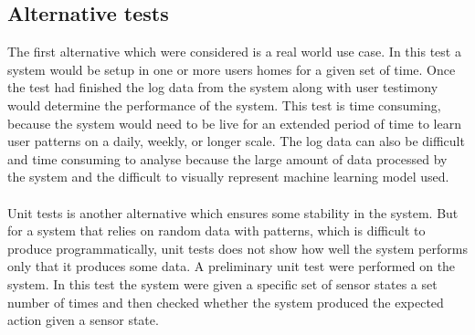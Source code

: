 \subsection{Alternative tests}
The first alternative which were considered is a real world use case. In this test a system would be setup in one or more users homes for a given set of time. Once the test had finished the log data from the system along with user testimony would determine the performance of the system. This test is time consuming, because the system would need to be live for an extended period of time to learn user patterns on a daily, weekly, or longer scale. The log data can also be difficult and time consuming to analyse because the large amount of data processed by the system and the difficult to visually represent machine learning model used.
\\\\
Unit tests is another alternative which ensures some stability in the system. But for a system that relies on random data with patterns, which is difficult to produce programmatically, unit tests does not show how well the system performs only that it produces some data. A preliminary unit test were performed on the system. In this test the system were given a specific set of sensor states a set number of times and then checked whether the system produced the expected action given a sensor state.
